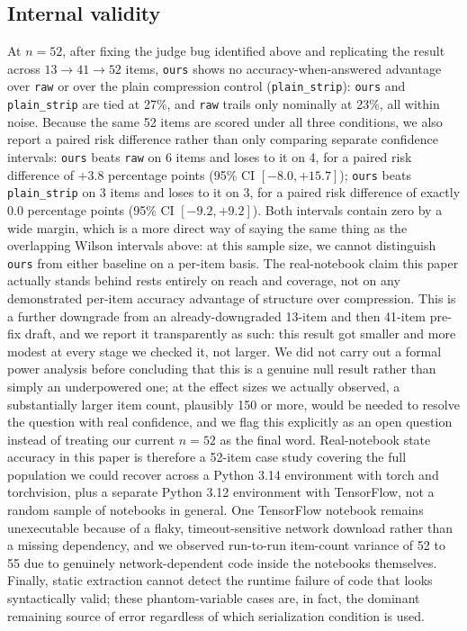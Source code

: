 \documentclass[11pt]{article}
\begin{document}
\subsection{Internal validity}
At $n{=}52$, after fixing the judge bug identified above and replicating
the result across $13\to41\to52$ items, \texttt{ours} shows no
accuracy-when-answered advantage over \texttt{raw} or over the plain
compression control (\texttt{plain\_strip}): \texttt{ours} and
\texttt{plain\_strip} are tied at 27\%, and \texttt{raw} trails only
nominally at 23\%, all within noise. Because the same 52 items are
scored under all three conditions, we also report a paired risk
difference rather than only comparing separate confidence intervals:
\texttt{ours} beats \texttt{raw} on 6 items and loses to it on 4, for a
paired risk difference of $+3.8$ percentage points (95\% CI
$[-8.0, +15.7]$); \texttt{ours} beats \texttt{plain\_strip} on 3 items and
loses to it on 3, for a paired risk difference of exactly $0.0$ percentage
points (95\% CI $[-9.2, +9.2]$). Both intervals contain zero by a wide
margin, which is a more direct way of saying the same thing as the
overlapping Wilson intervals above: at this sample size, we cannot
distinguish \texttt{ours} from either baseline on a per-item basis. The
real-notebook claim this paper
actually stands behind rests entirely on reach and coverage, not on any
demonstrated per-item accuracy advantage of structure over compression.
This is a further downgrade from an already-downgraded 13-item and then
41-item pre-fix draft, and we report it transparently as such: this
result got smaller and more modest at every stage we checked it, not
larger. We did not carry out a formal power analysis before concluding
that this is a genuine null result rather than simply an underpowered
one; at the effect sizes we actually observed, a substantially larger
item count, plausibly 150 or more, would be needed to resolve the
question with real confidence, and we flag this explicitly as an open
question instead of treating our current $n{=}52$ as the final word.
Real-notebook state accuracy in this paper is therefore a 52-item case
study covering the full population we could recover across a Python 3.14
environment with torch and torchvision, plus a separate Python 3.12
environment with TensorFlow, not a random sample of notebooks in general.
One TensorFlow notebook remains unexecutable because of a flaky,
timeout-sensitive network download rather than a missing dependency, and
we observed run-to-run item-count variance of 52 to 55 due to genuinely
network-dependent code inside the notebooks themselves. Finally, static
extraction cannot detect the runtime failure of code that looks
syntactically valid; these phantom-variable cases are, in fact, the
dominant remaining source of error regardless of which serialization
condition is used.
\end{document}
